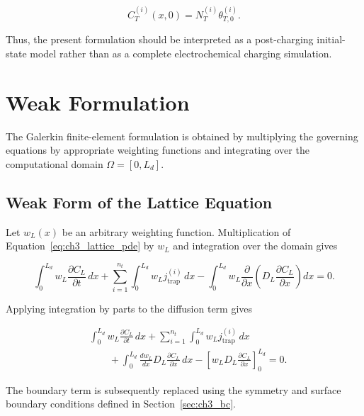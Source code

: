 \documentclass[a4paper,12pt,oneside]{report}
\begin{document}
\begin{equation}
C_T^{(i)}(x,0)
=
N_T^{(i)}
\theta_{T,0}^{(i)}.
\label{eq:ch3_initial_trap}
\end{equation}

Thus, the present formulation should be interpreted as a
post-charging initial-state model rather than as a complete
electrochemical charging simulation.



\section{Weak Formulation}
\label{sec:ch3_weak}

The Galerkin finite-element formulation is obtained by multiplying
the governing equations by appropriate weighting functions and
integrating over the computational domain $\Omega=[0,L_d]$.

\subsection{Weak Form of the Lattice Equation}

Let $w_L(x)$ be an arbitrary weighting function. Multiplication of
Equation~\eqref{eq:ch3_lattice_pde} by $w_L$ and integration over the
domain gives

\begin{equation}
\int_0^{L_d}
w_L
\frac{\partial C_L}{\partial t}\,dx
+
\sum_{i=1}^{n_t}
\int_0^{L_d}
w_L
j_{\mathrm{trap}}^{(i)}\,dx
-
\int_0^{L_d}
w_L
\frac{\partial}{\partial x}
\left(
D_L
\frac{\partial C_L}{\partial x}
\right)
dx
=0.
\end{equation}

Applying integration by parts to the diffusion term gives

\begin{align}
&
\int_0^{L_d}
w_L
\frac{\partial C_L}{\partial t}\,dx
+
\sum_{i=1}^{n_t}
\int_0^{L_d}
w_L
j_{\mathrm{trap}}^{(i)}\,dx
\nonumber\\
&\qquad+
\int_0^{L_d}
\frac{dw_L}{dx}
D_L
\frac{\partial C_L}{\partial x}\,dx
-
\left[
w_LD_L
\frac{\partial C_L}{\partial x}
\right]_0^{L_d}
=0.
\label{eq:ch3_weak_lattice}
\end{align}

The boundary term is subsequently replaced using the symmetry and
surface boundary conditions defined in Section~\ref{sec:ch3_bc}.
\end{document}
